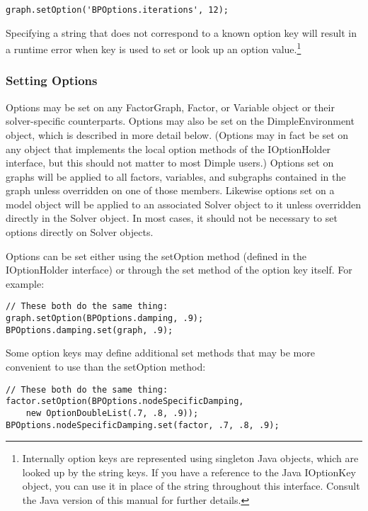 \begin{lstlisting}
graph.setOption('BPOptions.iterations', 12);
\end{lstlisting}

Specifying a string that does not correspond to a known option key will result in a runtime error when key is used to set or look up an option value.\footnote{Internally option keys are represented using singleton Java objects, which are looked up by the string keys. If you have a reference to the Java IOptionKey object, you can use it in place of the string throughout this interface. Consult the Java version of this manual for further details.}
\fi

\subsubsection{Setting Options}

Options may be set on any FactorGraph, Factor, or Variable object or their solver-specific counterparts. Options may also be set on the DimpleEnvironment object, which is described in more detail below. \ifjava(Options may in fact be set on any object that implements the local option methods of the IOptionHolder interface, but this should not matter to most Dimple users.) \fi Options set on graphs will be applied to all factors, variables, and subgraphs contained in the graph unless overridden on one of those members. Likewise options set on a model object will be applied to an associated Solver object to it unless overridden directly in the Solver object. In most cases, it should not be necessary to set options directly on Solver objects.

\ifjava
Options can be set either using the setOption method (defined in the IOptionHolder interface) or through the set method of the option key itself. For example:

\begin{lstlisting}
// These both do the same thing:
graph.setOption(BPOptions.damping, .9);
BPOptions.damping.set(graph, .9);
\end{lstlisting}

Some option keys may define additional set methods that may be more convenient to use than the setOption method:

\begin{lstlisting}
// These both do the same thing:
factor.setOption(BPOptions.nodeSpecificDamping,
    new OptionDoubleList(.7, .8, .9));
BPOptions.nodeSpecificDamping.set(factor, .7, .8, .9);
\end{lstlisting}
\fi

